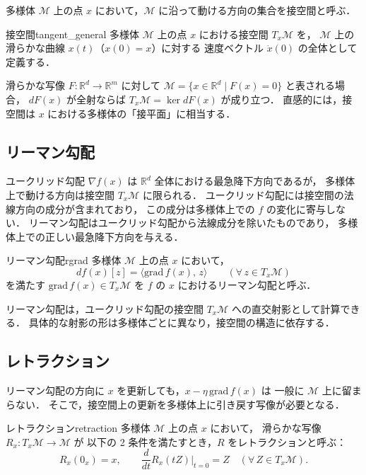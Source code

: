 \documentclass[uplatex, dvipdfmx]{jsarticle}
\begin{document}
多様体 $\mathcal{M}$ 上の点 $x$ において，$\mathcal{M}$ に沿って動ける方向の集合を接空間と呼ぶ．

\begin{definition}{接空間}{tangent_general}
多様体 $\mathcal{M}$ 上の点 $x$ における接空間 $T_x\mathcal{M}$ を，
$\mathcal{M}$ 上の滑らかな曲線 $x(t)$（$x(0)=x$）に対する
速度ベクトル $\dot{x}(0)$ の全体として定義する．
\end{definition}

滑らかな写像 $F\colon\mathbb{R}^d\to\mathbb{R}^m$ に対して
$\mathcal{M}=\{x\in\mathbb{R}^d\mid F(x)=0\}$ と表される場合，
$dF(x)$ が全射ならば $T_x\mathcal{M} = \ker dF(x)$ が成り立つ．
直感的には，接空間は $x$ における多様体の「接平面」に相当する．

\subsection{リーマン勾配}

ユークリッド勾配 $\nabla f(x)$ は $\mathbb{R}^d$ 全体における最急降下方向であるが，
多様体上で動ける方向は接空間 $T_x\mathcal{M}$ に限られる．
ユークリッド勾配には接空間の法線方向の成分が含まれており，
この成分は多様体上での $f$ の変化に寄与しない．
リーマン勾配はユークリッド勾配から法線成分を除いたものであり，
多様体上での正しい最急降下方向を与える．

\begin{definition}{リーマン勾配}{rgrad}
多様体 $\mathcal{M}$ 上の点 $x$ において，
\[
df(x)[z] = \langle \mathrm{grad}\, f(x),\, z \rangle
\qquad (\forall\, z \in T_x\mathcal{M})
\]
を満たす $\mathrm{grad}\, f(x) \in T_x\mathcal{M}$ を
$f$ の $x$ におけるリーマン勾配と呼ぶ．
\end{definition}

リーマン勾配は，ユークリッド勾配の接空間 $T_x\mathcal{M}$ への直交射影として計算できる．
具体的な射影の形は多様体ごとに異なり，接空間の構造に依存する．

\subsection{レトラクション}

リーマン勾配の方向に $x$ を更新しても，$x - \eta\,\mathrm{grad}\, f(x)$ は
一般に $\mathcal{M}$ 上に留まらない．
そこで，接空間上の更新を多様体上に引き戻す写像が必要となる．

\begin{definition}{レトラクション}{retraction}
多様体 $\mathcal{M}$ 上の点 $x$ において，
滑らかな写像 $R_x\colon T_x\mathcal{M}\to\mathcal{M}$ が
以下の 2 条件を満たすとき，$R$ をレトラクションと呼ぶ：
\[
R_x(0_x) = x, \qquad
\frac{d}{dt}R_x(tZ)\bigg|_{t=0} = Z
\quad (\forall\, Z\in T_x\mathcal{M}).
\]
\end{definition}
\end{document}
